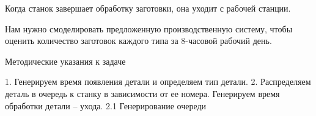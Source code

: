 Когда станок завершает обработку заготовки, она уходит с рабочей станции. 

Нам нужно смоделировать предложенную производственную систему, чтобы 
оценить количество заготовок каждого типа за 8-часовой рабочий день.

\begin{center}
	Методические указания к задаче 
\end{center}
1. Генерируем время появления детали и определяем тип детали.
2. Распределяем деталь в очередь к станку в зависимости от ее номера. Генерируем время обработки детали -- ухода.
2.1 Генерирование очереди
